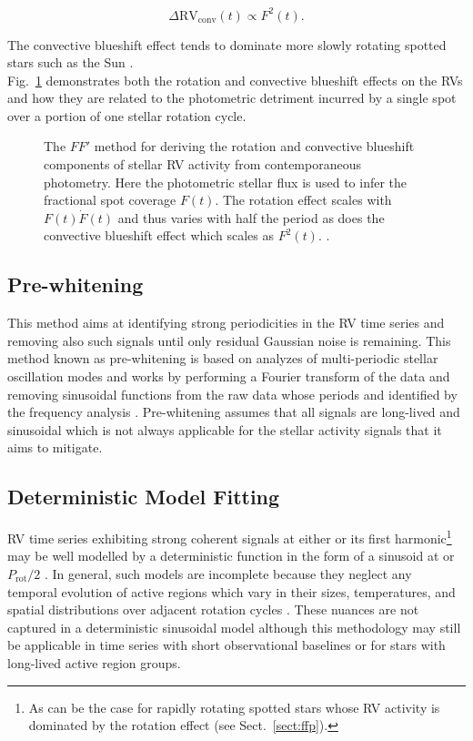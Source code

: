 \begin{equation}
  \Delta \text{RV}_{\text{conv}}(t) \propto F^2(t).
\end{equation}

\noindent The convective blueshift effect tends to dominate more slowly rotating spotted
stars such as the Sun \citep{haywood16}. \\

Fig.~\ref{fig:ffp} demonstrates both the rotation and
convective blueshift effects on the RVs and how they are related to the photometric detriment
incurred by a single spot over a portion of one stellar rotation cycle.

\begin{figure}
  \centering
  \caption[Illustration of the $FF'$ method.]
      {The $FF'$ method for deriving the rotation and convective blueshift components
    of stellar RV activity from contemporaneous photometry. Here the photometric stellar flux
    is used to infer the fractional spot coverage $F(t)$. The rotation effect scales with
    $F(t) \dot{F}(t)$ and thus varies with half the period as does the convective blueshift
    effect which scales as $F^2(t)$. \citep[Image credit:][]{haywood15}.}
  \label{fig:ffp}
\end{figure}


\subsection{Pre-whitening}
This method aims at identifying strong periodicities in the RV time series and removing also
such signals until only residual Gaussian noise is remaining. This method known as pre-whitening
is based on analyzes of multi-periodic stellar oscillation modes and works by performing a Fourier
transform of the data and removing sinusoidal functions from the raw data whose periods and
identified by the frequency analysis \citep{queloz09}. Pre-whitening assumes that all signals
are long-lived and sinusoidal which is not always applicable for the stellar activity signals
that it aims to mitigate. 

\subsection{Deterministic Model Fitting}
RV time series exhibiting strong coherent signals at either \prot{} or its first
harmonic\footnote{As can be the case for rapidly rotating spotted stars whose RV activity
  is dominated by the rotation effect (see Sect.~\ref{sect:ffp}).} may be well modelled by
a deterministic function in the form of a sinusoid at \prot{} or $P_{\text{rot}}/2$
\citep{boisse11}. In general, such models are incomplete because they neglect any temporal
evolution of active regions which vary in their sizes, temperatures, and spatial distributions
over adjacent rotation cycles \citep{giles17}. These nuances are not captured in a 
deterministic sinusoidal model although this methodology may still be applicable in time series
with short observational baselines or for stars with long-lived active region groups.



